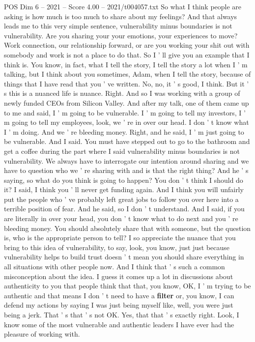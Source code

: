 \begin{textsample}{POS Dim 6 – 2021 – Score 4.00 – 2021/t004057.txt}
So what I think people are asking is how much is too much to share about my feelings?
And that always leads me to this very simple sentence, vulnerability minus boundaries is not vulnerability.
Are you sharing your your emotions, your experiences to move?
Work connection, our relationship forward, or are you working your shit out with somebody and work is not a place to do that.
So I ' ll give you an example that I think is.
You know, in fact, what I tell the story, I tell the story a lot when I ' m talking, but I think about you sometimes, Adam, when I tell the story, because of things that I have read that you ' ve written.
No, no, it ' s good, I think.
But it ' s this is a nuanced life is nuance.
Right.
And so I was working with a group of newly funded CEOs from Silicon Valley.
And after my talk, one of them came up to me and said, I ' m going to be vulnerable.
I ' m going to tell my investors, I ' m going to tell my employees, look, we ' re in over our head.
I don ' t know what I ' m doing.
And we ' re bleeding money.
Right, and he said, I ' m just going to be vulnerable.
And I said.
You must have stepped out to go to the bathroom and get a coffee during the part where I said vulnerability minus boundaries is not vulnerability.
We always have to interrogate our intention around sharing and we have to question who we ' re sharing with and is that the right thing?
And he ' s saying, so what do you think is going to happen?
You don ' t think I should do it?
I said, I think you ' ll never get funding again.
And I think you will unfairly put the people who ' ve probably left great jobs to follow you over here into a terrible position of fear.
And he said, so I don ' t understand.
And I said, if you are literally in over your head, you don ' t know what to do next and you ' re bleeding money.
You should absolutely share that with someone, but the question is, who is the appropriate person to tell?
I so appreciate the nuance that you bring to this idea of vulnerability, to say, look, you know, just just because vulnerability helps to build trust doesn ' t mean you should share everything in all situations with other people now.
And I think that ' s such a common misconception about the idea.
I guess it comes up a lot in discussions about authenticity to you that people think that that, you know, OK, I ' m trying to be authentic and that means I don ' t need to have a \textbf{filter} or, you know, I can defend my actions by saying I was just being myself like, well, you were just being a jerk.
That ' s that ' s not OK.
Yes, that that ' s exactly right.
Look, I know some of the most vulnerable and authentic leaders I have ever had the pleasure of working with.

\end{textsample}
